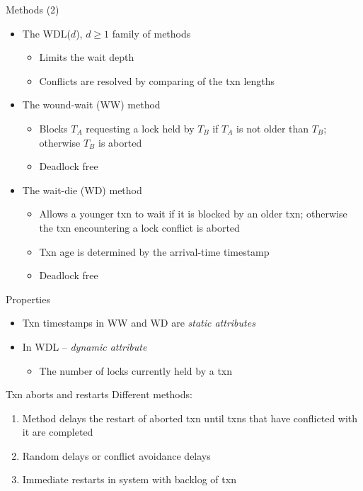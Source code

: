 \documentclass[sans]{beamer}
\begin{document}
\begin{frame}{Methods (2)}
  \begin{itemize}
    \item The WDL($d$), $d \geq 1$ family of methods
      \begin{itemize}
        \item Limits the wait depth
        \item Conflicts are resolved by comparing of the txn lengths
      \end{itemize}
    \item The wound-wait (WW) method
      \begin{itemize}
        \item Blocks $T_A$ requesting a lock held by $T_B$ if $T_A$
          is not older than $T_B$; otherwise $T_B$ is aborted
        \item Deadlock free
      \end{itemize}
    \item The wait-die (WD) method
      \begin{itemize}
        \item Allows a younger txn to wait if it is blocked by an older 
          txn; otherwise the txn encountering a lock conflict is aborted
        \item Txn age is determined by the arrival-time timestamp
        \item Deadlock free
      \end{itemize}
  \end{itemize}
\end{frame}

\begin{frame}{Properties}
  \begin{itemize}
    \item Txn timestamps in WW and WD are \emph{static attributes}
    \item In WDL -- \emph{dynamic attribute}
      \begin{itemize}
        \item The number of locks currently held by a txn
      \end{itemize}
  \end{itemize}
\end{frame}

\begin{frame}{Txn aborts and restarts}
  Different methods:
  \begin{enumerate}
    \item Method delays the restart of aborted txn until  txns
      that have
      conflicted with it are completed
    \item Random delays or conflict avoidance delays
    \item Immediate restarts in system with backlog of txn
  \end{enumerate}
\end{frame}
\end{document}
